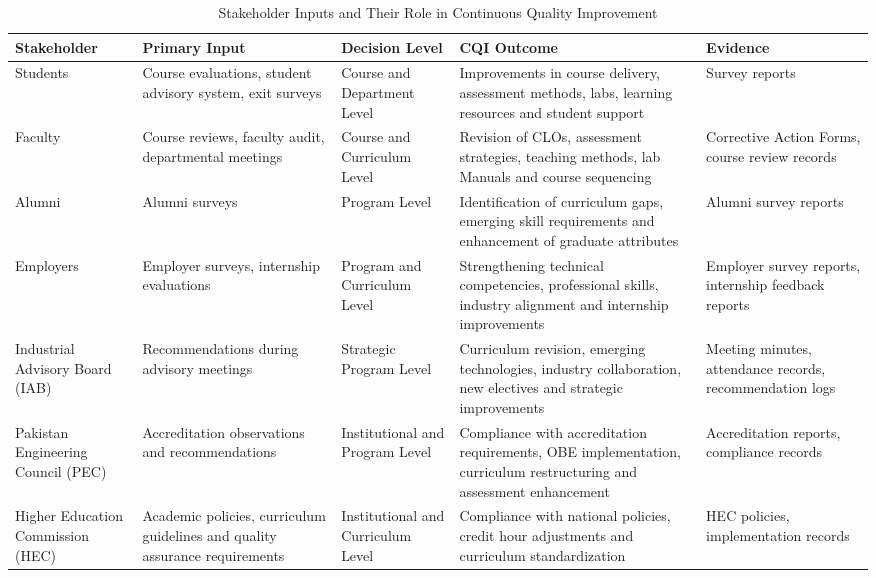 \begin{table}[!t]
\centering
\scriptsize                 %
\renewcommand{\arraystretch}{1.0}   %
\setlength{\tabcolsep}{3pt}         %
\caption{Stakeholder Inputs and Their Role in Continuous Quality Improvement}

\begin{tabular}{
>{\raggedright\arraybackslash}p{2.6cm}
>{\raggedright\arraybackslash}p{2.6cm}
>{\raggedright\arraybackslash}p{2.5cm}
>{\raggedright\arraybackslash}p{3.8cm}
>{\raggedright\arraybackslash}p{2.6cm}
}
\toprule
\textbf{Stakeholder} &
\textbf{Primary Input} &
\textbf{Decision Level} &
\textbf{CQI Outcome} &
\textbf{Evidence} \\
\midrule

Students &
Course evaluations, student advisory system, exit surveys &
Course and Department Level &
Improvements in course delivery, assessment methods, labs, learning resources and student support &
Survey reports \\
\addlinespace

Faculty &
Course reviews, faculty audit, departmental meetings &
Course and Curriculum Level &
Revision of CLOs, assessment strategies, teaching methods, lab Manuals and course sequencing &
Corrective Action Forms, course review records \\
\addlinespace

Alumni &
Alumni surveys&
Program Level &
Identification of curriculum gaps, emerging skill requirements and enhancement of graduate attributes &
Alumni survey reports\\
\addlinespace

Employers &
Employer surveys, internship evaluations &
Program and Curriculum Level &
Strengthening technical competencies, professional skills, industry alignment and internship improvements &
Employer survey reports, internship feedback reports \\
\addlinespace

Industrial Advisory Board (IAB) &
Recommendations during advisory meetings &
Strategic Program Level &
Curriculum revision, emerging technologies, industry collaboration, new electives and strategic improvements &
Meeting minutes, attendance records, recommendation logs \\
\addlinespace

Pakistan Engineering Council (PEC) &
Accreditation observations and recommendations &
Institutional and Program Level &
Compliance with accreditation requirements, OBE implementation, curriculum restructuring and assessment enhancement &
Accreditation reports, compliance records \\
\addlinespace

Higher Education Commission (HEC) &
Academic policies, curriculum guidelines and quality assurance requirements &
Institutional and Curriculum Level &
Compliance with national policies, credit hour adjustments and curriculum standardization &
HEC policies, implementation records \\
\bottomrule
\end{tabular}

\label{tab:stakeholder_cqi}
\end{table}

